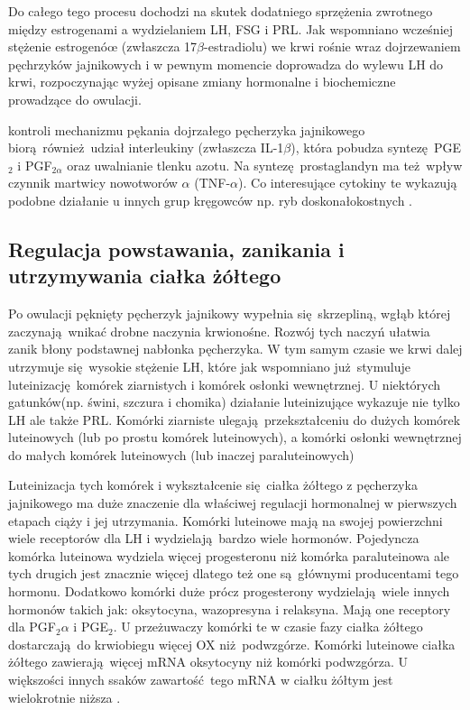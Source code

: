\documentclass[two column, twoside, a4paper]{article}
\begin{document}
Do całego tego procesu dochodzi na skutek dodatniego sprzężenia zwrotnego między estrogenami a wydzielaniem LH, FSG i PRL. Jak wspomniano wcześniej stężenie estrogenóœ (zwłaszcza 17$\beta$-estradiolu) we krwi rośnie wraz dojrzewaniem pęchrzyków jajnikowych i w pewnym momencie doprowadza do wylewu LH do krwi, rozpoczynając wyżej opisane zmiany hormonalne i biochemiczne prowadzące do owulacji.

 kontroli mechanizmu pękania dojrzałego pęcherzyka jajnikowego biorą również udział interleukiny (zwłaszcza IL-1$\beta$), która pobudza syntezę PGE$_{2}$ i PGF$_{2\alpha}$ oraz uwalnianie tlenku azotu. Na syntezę prostaglandyn ma też wpływ czynnik martwicy nowotworów $\alpha$ (TNF-$\alpha$). Co interesujące cytokiny te wykazują podobne działanie u innych grup kręgowców np. ryb doskonałokostnych \autocite{Watanabe1994, Crespo2015, Brannstrom1994, Brannstrom1995}.

\subsection{Regulacja powstawania, zanikania i utrzymywania ciałka żółtego}

Po owulacji pęknięty pęcherzyk jajnikowy wypełnia się skrzepliną, wgłąb której zaczynają wnikać drobne naczynia krwionośne. Rozwój tych naczyń ułatwia zanik błony podstawnej nabłonka pęcherzyka. W tym samym czasie we krwi dalej utrzymuje się wysokie stężenie LH, które jak wspomniano już stymuluje luteinizację komórek ziarnistych i komórek osłonki wewnętrznej. U niektórych gatunków(np. świni, szczura i chomika) działanie luteinizujące wykazuje nie tylko LH ale także PRL. Komórki ziarniste ulegają przekształceniu do dużych komórek luteinowych (lub po prostu komórek luteinowych), a komórki osłonki wewnętrznej do małych komórek luteinowych (lub inaczej paraluteinowych) \autocite{Krzymowski2005, Sawicki2017, Greenwald1973}

Luteinizacja tych komórek i wykształcenie się ciałka żółtego z pęcherzyka jajnikowego ma duże znaczenie dla właściwej regulacji hormonalnej w pierwszych etapach ciąży i jej utrzymania. Komórki luteinowe mają na swojej powierzchni wiele receptorów dla LH i wydzielają bardzo wiele hormonów. Pojedyncza komórka luteinowa wydziela więcej progesteronu niż komórka paraluteinowa ale tych drugich jest znacznie więcej dlatego też one są głównymi producentami tego hormonu. Dodatkowo komórki duże prócz progesterony wydzielają wiele innych hormonów takich jak: oksytocyna, wazopresyna i relaksyna. Mają one receptory dla PGF$_2\alpha$ i PGE$_{2}$. U przeżuwaczy komórki te w czasie fazy ciałka żółtego dostarczają do krwiobiegu więcej OX niż podwzgórze. Komórki luteinowe ciałka żółtego zawierają więcej mRNA oksytocyny niż komórki podwzgórza. U większości innych ssaków zawartość tego mRNA w ciałku żółtym jest wielokrotnie niższa \autocite{Krzymowski2005, Jones1988, Ivell1984}.
\end{document}

